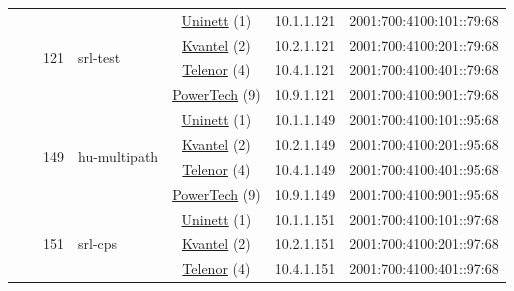 \begin{small}
\begin{center}
\begin{longtable}{|c|c|c|c|c|c|c|c|}
  &  & \multirow{4}{*}{\tiny{121}} & \multicolumn{1}{|l|}{\multirow{4}{*}{\tiny{srl-test}}} & \multicolumn{2}{|c|}{\tiny{\href{https://www.uninett.no}{Uninett} (1)}} & \tiny{10.1.1.121} & \tiny{2001:700:4100:101::79:68} \\* \cline{5-5}\cline{6-6}\cline{7-7}\cline{8-8}
  &  &  &  & \multicolumn{2}{|c|}{\tiny{\href{http://kvantel.no}{Kvantel} (2)}} & \tiny{10.2.1.121} & \tiny{2001:700:4100:201::79:68} \\* \cline{5-5}\cline{6-6}\cline{7-7}\cline{8-8}
  &  &  &  & \multicolumn{2}{|c|}{\tiny{\href{https://www.telenor.no}{Telenor} (4)}} & \tiny{10.4.1.121} & \tiny{2001:700:4100:401::79:68} \\* \cline{5-5}\cline{6-6}\cline{7-7}\cline{8-8}
  &  &  &  & \multicolumn{2}{|c|}{\tiny{\href{http://www.powertech.no}{PowerTech} (9)}} & \tiny{10.9.1.121} & \tiny{2001:700:4100:901::79:68} \\* \cline{3-3}\cline{4-4}\cline{5-5}\cline{6-6}\cline{7-7}\cline{8-8}
  &  & \multirow{4}{*}{\tiny{149}} & \multicolumn{1}{|l|}{\multirow{4}{*}{\tiny{hu-multipath}}} & \multicolumn{2}{|c|}{\tiny{\href{https://www.uninett.no}{Uninett} (1)}} & \tiny{10.1.1.149} & \tiny{2001:700:4100:101::95:68} \\* \cline{5-5}\cline{6-6}\cline{7-7}\cline{8-8}
  &  &  &  & \multicolumn{2}{|c|}{\tiny{\href{http://kvantel.no}{Kvantel} (2)}} & \tiny{10.2.1.149} & \tiny{2001:700:4100:201::95:68} \\* \cline{5-5}\cline{6-6}\cline{7-7}\cline{8-8}
  &  &  &  & \multicolumn{2}{|c|}{\tiny{\href{https://www.telenor.no}{Telenor} (4)}} & \tiny{10.4.1.149} & \tiny{2001:700:4100:401::95:68} \\* \cline{5-5}\cline{6-6}\cline{7-7}\cline{8-8}
  &  &  &  & \multicolumn{2}{|c|}{\tiny{\href{http://www.powertech.no}{PowerTech} (9)}} & \tiny{10.9.1.149} & \tiny{2001:700:4100:901::95:68} \\* \cline{3-3}\cline{4-4}\cline{5-5}\cline{6-6}\cline{7-7}\cline{8-8}
  &  & \multirow{4}{*}{\tiny{151}} & \multicolumn{1}{|l|}{\multirow{4}{*}{\tiny{srl-cps}}} & \multicolumn{2}{|c|}{\tiny{\href{https://www.uninett.no}{Uninett} (1)}} & \tiny{10.1.1.151} & \tiny{2001:700:4100:101::97:68} \\* \cline{5-5}\cline{6-6}\cline{7-7}\cline{8-8}
  &  &  &  & \multicolumn{2}{|c|}{\tiny{\href{http://kvantel.no}{Kvantel} (2)}} & \tiny{10.2.1.151} & \tiny{2001:700:4100:201::97:68} \\* \cline{5-5}\cline{6-6}\cline{7-7}\cline{8-8}
  &  &  &  & \multicolumn{2}{|c|}{\tiny{\href{https://www.telenor.no}{Telenor} (4)}} & \tiny{10.4.1.151} & \tiny{2001:700:4100:401::97:68} \\* \cline{5-5}\cline{6-6}\cline{7-7}\cline{8-8}

\end{longtable}
\end{center}
\end{small}
